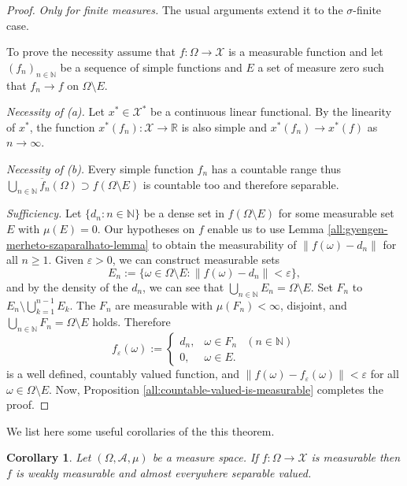 \documentclass[a4paper, 12pt]{article}
\newtheorem{corollary}[lem]{Corollary}
\begin{document}
\begin{proof} \emph{Only for finite measures.} The usual arguments extend it to the $\sigma$-finite case.

To prove the necessity assume that $f \colon \Omega \rightarrow \mathcal{X}$ is a measurable function and let $(f_n)_{n \in \mathbb{N}}$ be a sequence of simple functions and $E$ a set of measure zero such that $f_n \rightarrow f$ on $\Omega \setminus E$.

\emph{Necessity of (a).} Let $x^* \in \mathcal{X}^*$ be a continuous linear functional. By the linearity of $x^*$, the function $x^*(f_n) \colon \mathcal{X} \rightarrow \mathbb{R}$ is also simple and $x^*(f_n) \to x^*(f)$ as $n \to \infty$.

\emph{Necessity of (b).} Every simple function $f_n$ has a countable range thus $\overline{\bigcup_{n \in \mathbb{N}} f_n(\Omega)} \supset f(\Omega \setminus E)$ is countable too and therefore separable.

\emph{Sufficiency.} Let $\lbrace d_n : n \in \mathbb{N} \rbrace$ be a dense set in $f(\Omega \setminus E)$ for some measurable set $E$ with $\mu(E)=0$. Our hypotheses on $f$ enable us to use Lemma \ref{all:gyengen-merheto-szaparalhato-lemma} to obtain the measurability of $\| f(\omega) - d_n \|$ for all $n \geqslant 1$. Given $\varepsilon > 0$, we can construct measurable sets 
$$
E_n := \lbrace \omega \in \Omega \setminus E : \| f(\omega) - d_n \| < \varepsilon \rbrace,
$$ 
and by the density of the $d_n$, we can see that $\bigcup_{n \in \mathbb{N}} E_n = \Omega \setminus E$. Set $F_n$ to $E_n \setminus \bigcup^{n-1}_{k=1}E_k$. The $F_n$ are measurable with $\mu(F_n) < \infty$, disjoint, and $\bigcup_{n \in \mathbb{N}} F_n = \Omega \setminus E$ holds. Therefore
\begin{displaymath}
  f_{\varepsilon}(\omega) := \left\{
    \begin{array}{llr}
      d_n, &  \omega \in F_n & (n \in \mathbb{N})\\
      0, &  \omega \in E.
    \end{array}
  \right.
\end{displaymath}
is a well defined, countably valued function, and $\| f(\omega) - f_{\varepsilon}(\omega) \| < \varepsilon$ for all $\omega \in \Omega \setminus E$. Now, Proposition \ref{all:countable-valued-is-measurable} completes the proof.
\end{proof}
We list here some useful corollaries of the this theorem.
\begin{corollary}\label{all:mertheto-fuggveny-gyengen-is-meg-m-m-szep} Let $(\Omega, \mathcal{A}, \mu)$ be a measure space. If $f \colon \Omega \rightarrow \mathcal{X}$ is measurable then $f$ is weakly measurable and almost everywhere separable valued.
\end{corollary}
\end{document}

